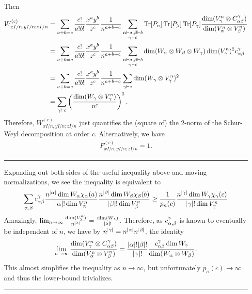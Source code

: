 \documentclass[notitlepage, 10pt]{article}
\begin{document}
    Then
    \begin{align}
        W_{xI/n,yI/n;zI/n}^{(c)} 
        &= \sum_{a+b=c}\frac{c!}{a!b!}\frac{x^ay^b}{z^c} \frac{1}{n^{a+b+c}} \sum_{\substack{\alpha\vdash a,\beta \vdash b \\ \gamma\vdash c}} \operatorname{Tr}[P_{\alpha}]\operatorname{Tr}[P_{\beta}]\operatorname{Tr}[P_{\gamma}]\frac{\dim (V_{\gamma}^n \otimes C^{\gamma}_{\alpha\beta})}{\dim (V_{\alpha}^{n} \otimes V_{\beta}^{n})} \\
        &= \sum_{a+b=c}\frac{c!}{a!b!}\frac{x^ay^b}{z^c} \frac{1}{n^{a+b+c}} \sum_{\substack{\alpha\vdash a,\beta \vdash b \\ \gamma\vdash c}} \dim(W_{\alpha}\otimes W_{\beta} \otimes W_{\gamma}) \dim (V_{\gamma}^n)^2 c^{\gamma}_{\alpha\beta} \\
        &= \sum_{a+b=c}\frac{c!}{a!b!}\frac{x^ay^b}{z^c} \frac{1}{n^{a+b+c}} \sum_{\gamma\vdash c} \dim(W_{\gamma} \otimes V_{\gamma}^n)^2 \\
        &= \sum_{\gamma\vdash c} \left(\frac{\dim(W_{\gamma} \otimes V_{\gamma}^n)}{n^{c}}\right)^2.
    \end{align}
    Therefore, $W_{xI/n,yI/n;zI/n}^{(c)}$ just quantifies the (square of) the $2$-norm of the Schur-Weyl decomposition at order $c$.
    Alternatively, we have
    \begin{align}
        F_{xI/n,yI/n;zI/n}^{(c)} = 1.
    \end{align}
\hrule
    Expanding out both sides of the useful inequality above and moving normalizations, we see the inequality is equivalent to
    \begin{equation}
        \sum_{\alpha,\beta}c^{\gamma}_{\alpha\beta} \frac{n^{{|\alpha|}}\dim W_{\alpha} \chi_{\alpha}(a)}{{|\alpha|}!\dim V_{\alpha}^{n}}\frac{n^{{|\beta|}}\dim W_{\beta} \chi_{\beta}(b)}{{|\beta|}!\dim V_{\beta}^{n}} \geq \frac{1}{p_n(c)}\frac{n^{{|\gamma|}}\dim W_{\gamma} \chi_{\gamma}(c)}{{|\gamma|}!\dim V_{\gamma}^n}
    \end{equation}
    Amazingly, $\lim_{n\to\infty} \frac{\dim(V_{\lambda}^{n})}{n^{{|\lambda|}}} = \frac{\dim(W_{\lambda})}{{|\lambda|}!}$.
    Therefore, as $c^{\gamma}_{\alpha,\beta}$ is known to eventually be independent of $n$, we have by $n^{{|\gamma|}} = n^{{|\alpha|}}n^{{|\beta|}}$, the identity
    \begin{equation}
        \lim_{n\to\infty} \frac{\dim (V_{\gamma}^n \otimes C^{\gamma}_{\alpha\beta})}{\dim (V_{\alpha}^{n} \otimes V_{\beta}^{n})}= \frac{{|\alpha|}!{|\beta|}!}{{|\gamma|}!} \frac{c^{\gamma}_{\alpha\beta}\dim W_{\gamma}}{\dim (W_{\alpha} \otimes W_{\beta})}.
    \end{equation}
    This almost simplifies the inequality as $n\to\infty$, but unfortunately $p_n(c) \to \infty$ and thus the lower-bound trivializes.
\hrule
\end{document}
